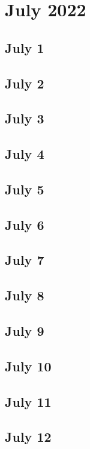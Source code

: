 \chapter{July 2022}

\section{July 1}

\section{July 2}

\section{July 3}

\section{July 4}

\section{July 5}

\section{July 6}

\section{July 7}

\section{July 8}

\section{July 9}

\section{July 10}

\section{July 11}

\section{July 12}


